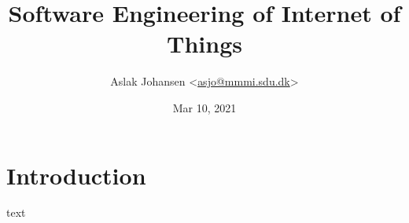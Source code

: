 \documentclass[a4paper]{article}
\begin{document}
\title{Software Engineering of Internet of Things\\\scalebox{.85}{Handin 0: Sampling Rate}}
\author{Aslak Johansen <\href{mailto:asjo@mmmi.sdu.dk}{asjo@mmmi.sdu.dk}>}
\date{Mar 10, 2021}
\maketitle
\vspace{5mm}

\section{Introduction}

text
\end{document}
